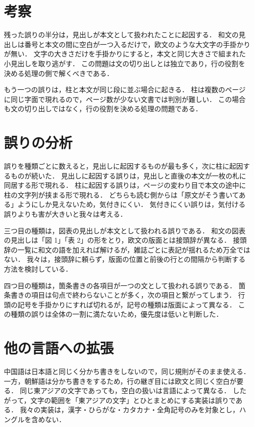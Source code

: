 \documentclass[11pt,a4paper]{article}
\newcommand{\s}[1]{#1}
\begin{document}
\section{考察}

\s{残った誤りの半分は，見出しが本文として扱われたことに起因する．}%
\s{和文の見出しは番号と本文の間に空白が一つ入るだけで，欧文のような大文字の手掛かりが無い．}%
\s{文字の大きさだけを手掛かりにすると，本文と同じ大きさで組まれた小見出しを取り逃がす．}%
\s{この問題は文の切り出しとは独立であり，行の役割を決める処理の側で解くべきである．}%

\s{もう一つの誤りは，柱と本文が同じ段に並ぶ場合に起きる．}%
\s{柱は複数のページに同じ字面で現れるので，ページ数が少ない文書では判別が難しい．}%
\s{この場合も文の切り出しではなく，行の役割を決める処理の問題である．}%

\section{誤りの分析}

\s{誤りを種類ごとに数えると，見出しに起因するものが最も多く，次に柱に起因するものが続いた．}%
\s{見出しに起因する誤りは，見出しと直後の本文が一枚の札に同居する形で現れる．}%
\s{柱に起因する誤りは，ページの変わり目で本文の途中に柱の文字列が挟まる形で現れる．}%
\s{どちらも読む側からは「原文がそう書いてある」ようにしか見えないため，気付きにくい．}%
\s{気付きにくい誤りは，気付ける誤りよりも害が大きいと我々は考える．}%

\s{三つ目の種類は，図表の見出しが本文として扱われる誤りである．}%
\s{和文の図表の見出しは「図 1」「表 2」の形をとり，欧文の版面とは接頭辞が異なる．}%
\s{接頭辞の一覧に和文の語を加えれば解けるが，雑誌ごとに表記が揺れるため万全ではない．}%
\s{我々は，接頭辞に頼らず，版面の位置と前後の行との間隔から判断する方法を検討している．}%

\s{四つ目の種類は，箇条書きの各項目が一つの文として扱われる誤りである．}%
\s{箇条書きの項目は句点で終わらないことが多く，次の項目と繋がってしまう．}%
\s{行頭の記号を手掛かりにすれば切れるが，記号の種類は版面によって異なる．}%
\s{この種類の誤りは全体の一割に満たないため，優先度は低いと判断した．}%

\section{他の言語への拡張}

\s{中国語は日本語と同じく分かち書きをしないので，同じ規則がそのまま使える．}%
\s{一方，朝鮮語は分かち書きをするため，行の継ぎ目には欧文と同じく空白が要る．}%
\s{同じ東アジアの文字であっても，空白の扱いは言語によって異なる．}%
\s{したがって，文字の範囲を「東アジアの文字」とひとまとめにする実装は誤りである．}%
\s{我々の実装は，漢字・ひらがな・カタカナ・全角記号のみを対象とし，ハングルを含めない．}%
\end{document}

